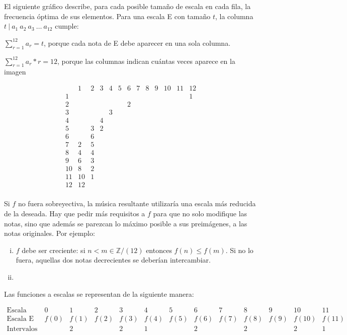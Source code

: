 		El siguiente gráfico describe, para cada posible tamaño de escala en cada fila, la frecuencia óptima de sus elementos. Para una escala E con tamaño $t$, la columna $t\ |\ a_1\ a_2\ a_3\ \ldots\ a_{12}$ cumple:
		
		$\sum_{r=1}^{12}a_r=t$, porque cada nota de E debe aparecer en una sola columna.
		
		$\sum_{r=1}^{12}a_r*r=12$, porque las columnas indican cuántas veces aparece en la imagen
		
		$$\begin{array}{l|rrrrrrrrrrrr}
		&1&2&3&4&5&6&7&8&9&10&11&12\\\hline
		1&&&&&&&&&&&&1\\\hline
		2&&&&&&2\\\hline
		3&&&&3\\\hline
		4&&&4\\\hline
		5&&3&2\\\hline
		6&&6\\\hline
		7&2&5\\\hline
		8&4&4\\\hline
		9&6&3\\\hline
		10&8&2\\\hline
		11&10&1\\\hline
		12&12&\\
		\end{array}$$
		
		Si $f$ no fuera sobreyectiva, la música resultante utilizaría una escala más reducida de la deseada. Hay que pedir más requisitos a $f$ para que no solo modifique las notas, sino que además se parezcan lo máximo posible a sus preimágenes, a las notas originales. Por ejemplo:
		
		\begin{enumerate}[i)]
			\item{$f$ debe ser creciente: si $n<m\in\mathbb{Z}/(12)$ entonces $f(n)\leq f(m)$. Si no lo fuera, aquellas dos notas decrecientes se deberían intercambiar.}
			\item{
					
			}
		\end{enumerate}
		
		Las funciones a escalas se representan de la siguiente manera:
		
		$$\left.\begin{matrix}
		\text{Escala cromática:}&0&1&2&3&4&5&6&7&8&9&10&11\\
		\text{Escala E}&f(0)&f(1)&f(2)&f(3)&f(4)&f(5)&f(6)&f(7)&f(8)&f(9)&f(10)&f(11)\\
		\text{Intervalos}&&2&&2&1&&2&&2&&2&1\\
		\end{matrix}\right.$$

